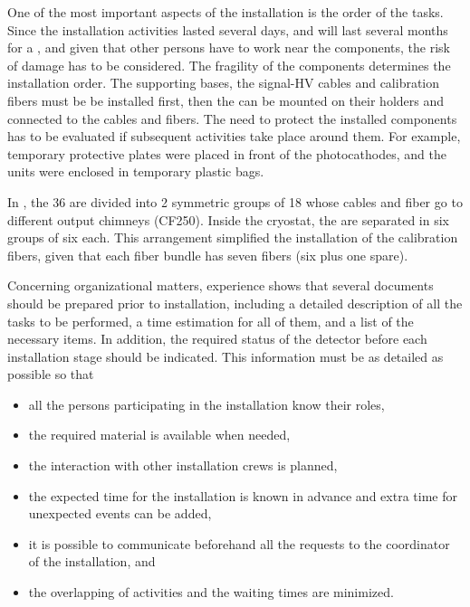 One of the most important aspects of the installation is the order of the tasks. Since the   installation activities lasted several days, %
and will last several months for a , and given that other persons have to work near the  components, the risk of damage has to be considered. The fragility of the components determines the installation order. The  supporting bases, the signal-HV  cables and calibration fibers must be be installed first, then the  can be mounted on their holders and connected to the cables and fibers. The need to protect the installed components has to be evaluated if subsequent activities take place around them. For example,  temporary protective plates were placed in front of the   photocathodes, and the  units were enclosed in temporary plastic bags. 

In , the \num{36}  are divided into \num{2} symmetric groups of 18 whose cables and fiber go to different output chimneys (CF250). Inside the cryostat, the  are separated in six groups of six each. This arrangement simplified the installation of the calibration fibers, given that each fiber bundle has seven fibers (six plus one spare). 

Concerning organizational matters,  experience shows that several documents should be prepared prior to installation, including a detailed description of all the tasks to be performed, a time estimation for all of them, and a list of the necessary items. In addition, the required status of the detector before each installation stage should be indicated. This information must be as detailed as possible so that %

\begin{itemize}
\item all the persons participating in the  installation know their roles,
\item the required material is %
available when needed,
\item the interaction with other installation crews is planned,
\item the expected time for the installation is known in advance and extra time for unexpected events can be added,
\item it is possible to communicate beforehand all the requests to the coordinator of the installation, and
\item the overlapping of activities and the waiting times are minimized. 
\end{itemize}

